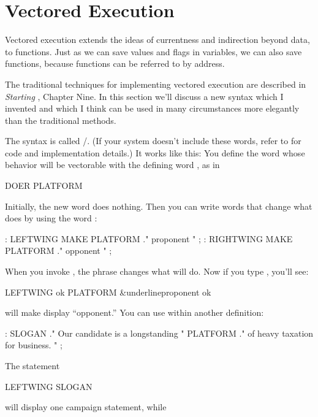 \section{Vectored Execution}%

Vectored execution extends the ideas of currentness and indirection
beyond data, to functions. Just as we can save values and flags in
variables, we can also save functions, because functions can be referred to
by address.

The traditional techniques for implementing vectored execution are
described in \emph{Starting \Forth{}}, Chapter Nine. In this section we'll
discuss a new syntax which I invented and which I think can be used in many
circumstances more elegantly than the traditional methods.

%
The syntax is called /. (If your system doesn't
include these words, refer to  for code and implementation
details.) It works like this: You define the word whose behavior will be
vectorable with the defining word , as in

\begin{Code}
DOER PLATFORM
\end{Code}
Initially, the new word  does nothing. Then you can write
words that change what  does by using the word :

\begin{Code}
: LEFTWING   MAKE PLATFORM  ." proponent " ;
: RIGHTWING  MAKE PLATFORM  ." opponent " ;
\end{Code}
When you invoke , the phrase  changes
what  will do. Now if you type , you'll see:

\begin{Code}[commandchars=\&\{\}]
LEFTWING ok
PLATFORM &underline{proponent ok}
\end{Code}
 will make  display ``opponent.'' You can
use  within another definition:

\begin{Code}
: SLOGAN   ." Our candidate is a longstanding " PLATFORM
   ." of heavy taxation for business. " ;
\end{Code}
The statement

\begin{Code}
LEFTWING SLOGAN
\end{Code}
will display one campaign statement, while

